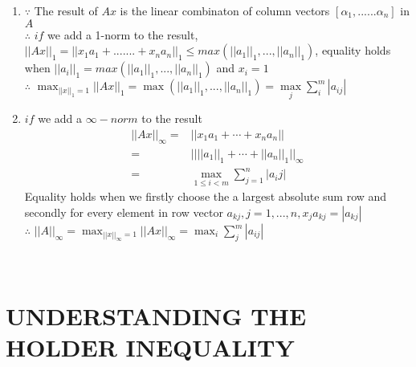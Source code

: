 \documentclass[english,onecolumn,UTF8]{IEEEtran}
\begin{document}
\begin{enumerate}
	\item
		$\because$ The result of $Ax$ is the linear combinaton of column vectors $[\alpha_{1},......\alpha_{n}]$ in $A$\\
		$\therefore$ $if$ we add a 1-norm to the result,$||Ax||_{1}=||x_{1}a_{1}+.......+x_{n}a_{n}||_{1}\leq max(||a_{1}||_{1},...,||a_{n}||_{1})$, equality holds when $||a_{i}||_{1}=max(||a_{1}||_{1},...,||a_{n}||_{1})$ and $x_{i}=1$ \\
		$\therefore$ $\max_{||x||_{1}=1}||Ax||_{1} = \max(||a_{1}||_{1},...,||a_{n}||_{1})=\max\limits_{j}\sum\limits_{i}^{m}|a_{ij}|$

	\item
		$if$ we add a $\infty-norm$ to the result
		\begin{align*}
			||Ax||_\infty
			=&||x_1a_1+\cdots+x_na_n||\\
			=&||||a_1||_1+\cdots+||a_n||_1||_\infty\\
			=&\max_{1\leq i<m}\sum_{j=1}^n|a_ij|
		\end{align*}
		Equality holds when we firstly choose the a largest absolute sum row and secondly for every element in row vector $a_{kj},j=1,...,n, x_ja_{kj}=|a_{kj}|$ \\
		$\therefore$ $||A||_{\infty}=\max_{||x||_{\infty}=1}||Ax||_{\infty}=\max_{i}\sum_{j}^{m}|a_{ij}|$
\end{enumerate}

~\\
\section{UNDERSTANDING THE HOLDER INEQUALITY}
\end{document}
